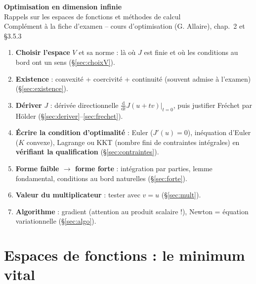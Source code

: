 \documentclass[10pt,a4paper]{article}
\newcommand{\dd}{\,\mathrm{d}x}
\begin{document}
\begin{center}
{\Large\bfseries Optimisation en dimension infinie}\\[2pt]
{\large Rappels sur les espaces de fonctions et méthodes de calcul}\\[2pt]
{\small Complément à la fiche d'examen -- cours d'optimisation (G. Allaire), chap.~2 et §3.5.3}
\end{center}

\begin{retenir}[ : la démarche d'un exercice type « minimiser $J(u)=\int_\Omega F(x,u,\nabla u)\dd$ »]
\begin{enumerate}
\item \textbf{Choisir l'espace} $V$ et sa norme : là où $J$ est finie et où les conditions au bord ont un sens (§\ref{sec:choixV}).
\item \textbf{Existence} : convexité + coercivité + continuité (souvent admise à l'examen) (§\ref{sec:existence}).
\item \textbf{Dériver} $J$ : dérivée directionnelle $\frac{\mathrm d}{\mathrm dt}J(u+tv)|_{t=0}$, puis justifier Fréchet par Hölder (§\ref{sec:deriver}--\ref{sec:frechet}).
\item \textbf{Écrire la condition d'optimalité} : Euler ($J'(u)=0$), inéquation d'Euler ($K$ convexe), Lagrange ou KKT (nombre fini de contraintes intégrales) en \textbf{vérifiant la qualification} (§\ref{sec:contraintes}).
\item \textbf{Forme faible $\to$ forme forte} : intégration par parties, lemme fondamental, conditions au bord naturelles (§\ref{sec:forte}).
\item \textbf{Valeur du multiplicateur} : tester avec $v=u$ (§\ref{sec:mult}).
\item \textbf{Algorithme} : gradient (attention au produit scalaire !), Newton = équation variationnelle (§\ref{sec:algo}).
\end{enumerate}
\end{retenir}

\section{Espaces de fonctions : le minimum vital}
\end{document}
